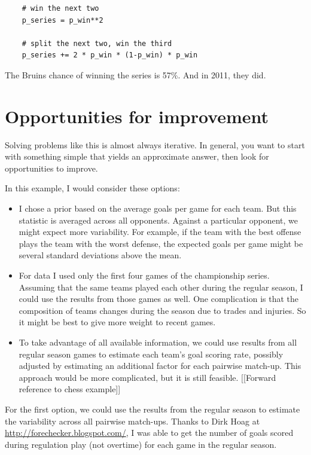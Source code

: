 \documentclass[12pt]{book}
\begin{document}
\begin{verbatim}
    # win the next two
    p_series = p_win**2

    # split the next two, win the third
    p_series += 2 * p_win * (1-p_win) * p_win
\end{verbatim}  

The Bruins chance of winning the series is 57\%.  And in 2011,
they did.


\section{Opportunities for improvement}

Solving problems like this is almost always iterative.  In general,
you want to start with something simple that yields an approximate
answer, then look for opportunities to improve.

In this example, I would consider these options:

\begin{itemize}

\item I chose a prior based on the average goals per game for each
  team.  But this statistic is averaged across all opponents.  Against
  a particular opponent, we might expect more variability.  For
  example, if the team with the best offense plays the team with the
  worst defense, the expected goals per game might be several standard
  deviations above the mean.

\item For data I used only the first four games of the championship
  series.  Assuming that the same teams played each other during the
  regular season, I could use the results from those games as well.
  One complication is that the composition of teams changes during
  the season due to trades and injuries.  So it might be best to
  give more weight to recent games.

\item To take advantage of all available information, we could
  use results from all regular season games to estimate each team's
  goal scoring rate, possibly adjusted by estimating
  an additional factor for each pairwise match-up.  This approach
  would be more complicated, but it is still feasible.
  [[Forward reference to chess example]]

\end{itemize}

For the first option, we could use the results from the regular season
to estimate the variability across all pairwise match-ups.  Thanks to
Dirk Hoag at \url{http://forechecker.blogspot.com/}, I was able to get
the number of goals scored during regulation play (not overtime) for
each game in the regular season.
\end{document}
